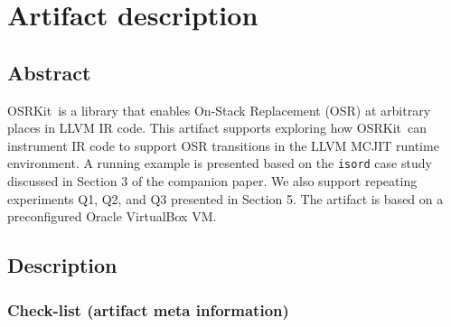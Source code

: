 \documentclass{sigplanconf}
\newcommand{\osrkit}{{\sf OSRKit}}
\begin{document}


\appendix
\section{Artifact description}


\subsection{Abstract}

\osrkit\ is a library that enables On-Stack Replacement (OSR) at arbitrary places in LLVM IR code. This artifact supports exploring how \osrkit\ can instrument IR code to support OSR transitions in the LLVM MCJIT runtime environment. A running example is presented based on the \texttt{isord} case study discussed in Section 3 of the companion paper. We also support repeating experiments Q1, Q2, and Q3 presented in Section 5. The artifact is based on a preconfigured Oracle VirtualBox VM.


\subsection{Description}

\subsubsection{Check-list (artifact meta information)}

\end{document}

